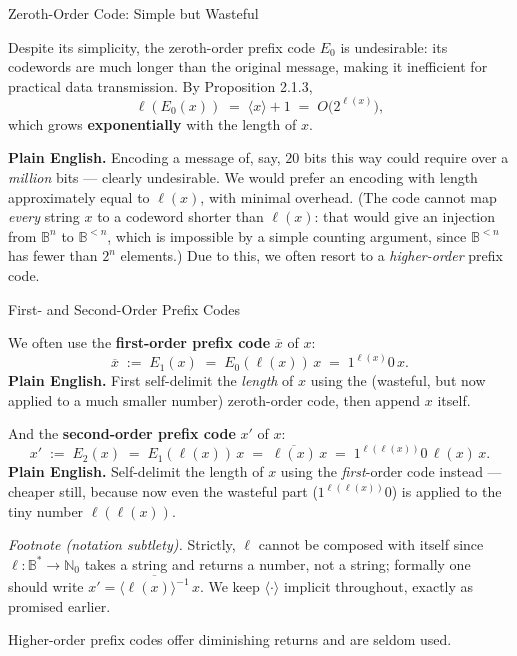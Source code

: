 \documentclass[aspectratio=169,10pt]{beamer}
\newcommand{\Bs}{\mathbb{B}^{*}}
\newcommand{\Bb}{\mathbb{B}}
\newcommand{\len}{\ell}
\newcommand{\bij}[1]{\langle #1\rangle}
\begin{document}
\begin{frame}{Zeroth-Order Code: Simple but Wasteful}

Despite its simplicity, the zeroth-order prefix code $E_0$ is undesirable:
its codewords are much longer than the original message, making it
inefficient for practical data transmission. By Proposition 2.1.3,
\[
  \len(E_0(x)) \;=\; \bij{x}+1 \;=\; O\bigl(2^{\len(x)}\bigr),
\]
which grows \textbf{exponentially} with the length of $x$.

\textbf{Plain English.} Encoding a message of, say, $20$ bits this way
could require over a \emph{million} bits --- clearly undesirable. We would
prefer an encoding with length approximately equal to $\len(x)$, with
minimal overhead. (The code cannot map \emph{every} string $x$ to a
codeword shorter than $\len(x)$: that would give an injection from $\Bb^n$
to $\Bb^{<n}$, which is impossible by a simple counting argument, since
$\Bb^{<n}$ has fewer than $2^n$ elements.) Due to this, we often resort to
a \emph{higher-order} prefix code.
\end{frame}

\begin{frame}{First- and Second-Order Prefix Codes}

We often use the \textbf{first-order prefix code} $\overline{x}$ of $x$:
\[
  \overline{x} \;:=\; E_1(x) \;=\; E_0(\len(x))\,x \;=\; 1^{\len(x)}0\,x .
\]
\textbf{Plain English.} First self-delimit the \emph{length} of $x$ using
the (wasteful, but now applied to a much smaller number) zeroth-order
code, then append $x$ itself.

\medskip
And the \textbf{second-order prefix code} $x'$ of $x$:
\[
  x' \;:=\; E_2(x) \;=\; E_1(\len(x))\,x \;=\; \overline{\len(x)}\,x \;=\;
  1^{\len(\len(x))}0\,\len(x)\,x .
\]
\textbf{Plain English.} Self-delimit the length of $x$ using the
\emph{first}-order code instead --- cheaper still, because now even the
wasteful part ($1^{\len(\len(x))}0$) is applied to the tiny number
$\len(\len(x))$.

\medskip
\emph{Footnote (notation subtlety).} Strictly, $\len$ cannot be composed
with itself since $\len:\Bs\to\mathbb{N}_0$ takes a string and returns a
number, not a string; formally one should write
$x'=\overline{\bij{\len(x)}^{-1}}\,x$. We keep $\bij{\cdot}$ implicit
throughout, exactly as promised earlier.

\medskip
Higher-order prefix codes offer diminishing returns and are seldom used.
\end{frame}
\end{document}
